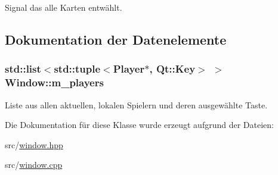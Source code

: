 Signal das alle Karten entwählt. 



\subsection{Dokumentation der Datenelemente}
\hypertarget{class_window_af408d7d1516a7352c3076e71b8fad7d9}{}
\subsubsection[{m\+\_\+players}]{\setlength{\rightskip}{0pt plus 5cm}std\+::list$<$std\+::tuple$<${\bf Player}$\ast$, Qt\+::\+Key$>$ $>$ Window\+::m\+\_\+players}\label{class_window_af408d7d1516a7352c3076e71b8fad7d9}


Liste aus allen aktuellen, lokalen Spielern und deren ausgewählte Taste. 



Die Dokumentation für diese Klasse wurde erzeugt aufgrund der Dateien\+:\begin{DoxyCompactItemize}
\item 
src/\hyperlink{window_8hpp}{window.\+hpp}\item 
src/\hyperlink{window_8cpp}{window.\+cpp}\end{DoxyCompactItemize}
